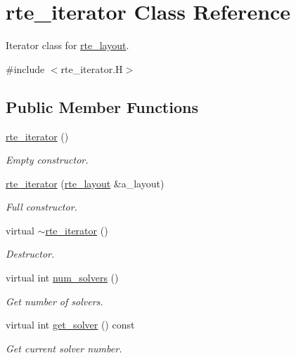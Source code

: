 \hypertarget{classrte__iterator}{}\section{rte\+\_\+iterator Class Reference}
\label{classrte__iterator}


Iterator class for \hyperlink{classrte__layout}{rte\+\_\+layout}.  




{\ttfamily \#include $<$rte\+\_\+iterator.\+H$>$}

\subsection*{Public Member Functions}
\begin{DoxyCompactItemize}
\item 
\hyperlink{classrte__iterator_a4d57cdf5fd937270eb906c57deec9f82}{rte\+\_\+iterator} ()
\begin{DoxyCompactList}\small\item\em Empty constructor. \end{DoxyCompactList}\item 
\hyperlink{classrte__iterator_a9f0c0a6ae128fa2da3376e232357d31a}{rte\+\_\+iterator} (\hyperlink{classrte__layout}{rte\+\_\+layout} \&a\+\_\+layout)
\begin{DoxyCompactList}\small\item\em Full constructor. \end{DoxyCompactList}\item 
virtual \hyperlink{classrte__iterator_a0f3db54f38d417641b55c3bf662c6b6c}{$\sim$rte\+\_\+iterator} ()
\begin{DoxyCompactList}\small\item\em Destructor. \end{DoxyCompactList}\item 
virtual int \hyperlink{classrte__iterator_ad2377a1e6c047c2367a41d9f4ede7bb7}{num\+\_\+solvers} ()
\begin{DoxyCompactList}\small\item\em Get number of solvers. \end{DoxyCompactList}\item 
virtual int \hyperlink{classrte__iterator_a13f0588763823cbaed7126e6f17fec7a}{get\+\_\+solver} () const 
\begin{DoxyCompactList}\small\item\em Get current solver number. \end{DoxyCompactList}\item 

\end{DoxyCompactItemize}
